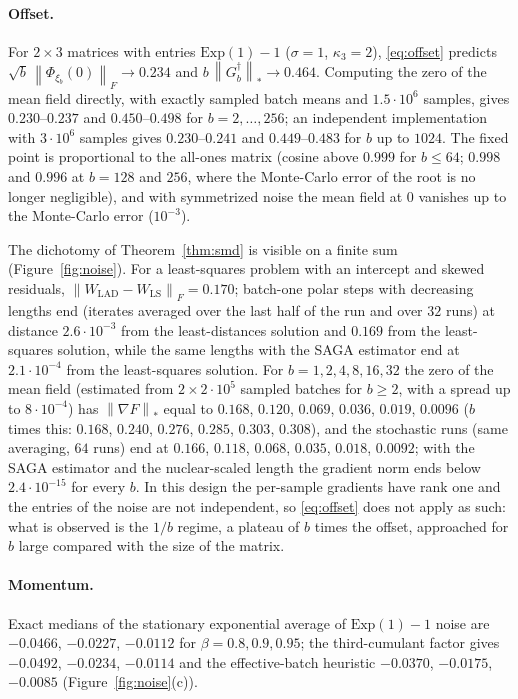 \documentclass[11pt]{article}
\theoremstyle{remark}
\newcommand{\nnuc}[1]{\left\|#1\right\|_{*}}
\newcommand{\nF}[1]{\left\|#1\right\|_{F}}
\begin{document}
\paragraph{Offset.} For $2\times3$ matrices with entries $\mathrm{Exp}(1)-1$ ($\sigma=1$, $\kappa_3=2$),
\eqref{eq:offset} predicts $\sqrt b\,\nF{\Phi_{\xi_b}(0)}\to0.234$ and $b\,\nnuc{G_b^\dagger}\to0.464$. Computing the zero of
the mean field directly, with exactly sampled batch means and $1.5\cdot10^6$ samples, gives $0.230$--$0.237$ and
$0.450$--$0.498$ for $b=2,\dots,256$; an independent implementation with $3\cdot10^6$ samples gives $0.230$--$0.241$ and
$0.449$--$0.483$ for $b$ up to $1024$. The fixed point is proportional to the all-ones matrix (cosine above $0.999$ for
$b\le64$; $0.998$ and $0.996$ at $b=128$ and $256$, where the Monte-Carlo error of the root is no longer negligible),
and with symmetrized noise the mean field at $0$ vanishes up to the Monte-Carlo error ($10^{-3}$).

The dichotomy of Theorem~\ref{thm:smd} is visible on a finite sum (Figure~\ref{fig:noise}). For a least-squares
problem with an intercept and skewed residuals, $\nF{W_{\mathrm{LAD}}-W_{\mathrm{LS}}}=0.170$; batch-one polar steps
with decreasing lengths end (iterates averaged over the last half of the run and over $32$ runs) at distance
$2.6\cdot10^{-3}$ from the least-distances solution and $0.169$ from the least-squares solution, while the same lengths
with the SAGA estimator end at $2.1\cdot10^{-4}$ from the least-squares solution. For $b=1,2,4,8,16,32$ the zero of the
mean field (estimated from $2\times2\cdot10^5$ sampled batches for $b\ge2$, with a spread up to $8\cdot10^{-4}$) has
$\nnuc{\nabla F}$ equal to $0.168$, $0.120$, $0.069$, $0.036$, $0.019$, $0.0096$ ($b$ times this: $0.168$, $0.240$,
$0.276$, $0.285$, $0.303$, $0.308$), and the stochastic runs (same averaging, $64$ runs) end at $0.166$, $0.118$,
$0.068$, $0.035$, $0.018$, $0.0092$; with the SAGA estimator and the nuclear-scaled length the gradient norm ends below
$2.4\cdot10^{-15}$ for every $b$. In this design the per-sample gradients have rank one and the entries of the noise
are not independent, so \eqref{eq:offset} does not apply as such: what is observed is the $1/b$ regime, a plateau of
$b$ times the offset, approached for $b$ large compared with the size of the matrix.

\paragraph{Momentum.} Exact medians of the stationary exponential average of $\mathrm{Exp}(1)-1$ noise are
$-0.0466$, $-0.0227$, $-0.0112$ for $\beta=0.8,0.9,0.95$; the third-cumulant factor gives $-0.0492$, $-0.0234$, $-0.0114$
and the effective-batch heuristic $-0.0370$, $-0.0175$, $-0.0085$ (Figure~\ref{fig:noise}(c)).
\end{document}
